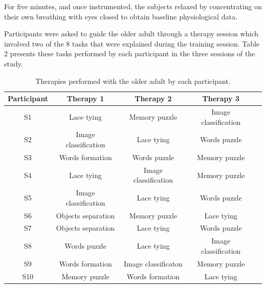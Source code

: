 For five minutes, and once instrumented, 
the subjects relaxed by concentrating on their
own breathing with eyes closed to obtain baseline
physiological data.	

Participants were asked to guide the older adult through
a therapy session which involved two of the 8 tasks that
were explained during the training session. Table 2
presents these tasks performed by each participant
in the three sessions of the study.

\begin{table}[h]
\centering
\caption{Therapies performed with the older adult by each
participant. }
\label{my-label}
\begin{tabular}{|c|c|c|c|c|}
\hline
 \textbf{Participant}&  \textbf{Therapy 1}& \textbf{Therapy 2}   & \textbf{Therapy 3}  \\ \hline
 S1&  Lace tying& Memory puzzle & Image classification   \\ \hline
 S2&  Image classification& Lace tying & Words puzzle   \\ \hline
 S3&  Words formation& Words puzzle & Memory puzzle    \\ \hline
 S4&  Lace tying& Image classification & Memory puzzle   \\ \hline
 S5&  Image classification&  Lace tying & Words puzzle   \\ \hline
 S6&  Objects separation& Memory puzzle & Lace tying   \\ \hline
 S7&  Objects separation & Lace tying & Words puzzle   \\ \hline
 S8&  Words puzzle& Lace tying & Image classification   \\ \hline
 S9&  Words formation& Image classificaton & Memory puzzle   \\ \hline
 S10&  Memory puzzle& Words formation & Lace tying   \\ \hline
\end{tabular}
\end{table}

